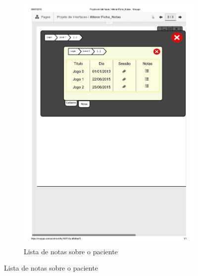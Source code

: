 \documentclass[12pt]{article}
\begin{document}
\begin{figure}[h]
\begin{subfigure}{0.5\textwidth}
\includegraphics[scale=0.4]{imagens/Alterar_Ficha_Notas.pdf} 
\caption{Lista de notas sobre o paciente}
\label{alterar_ficha_notas}
\end{subfigure}
\end{figure}
\end{document}
